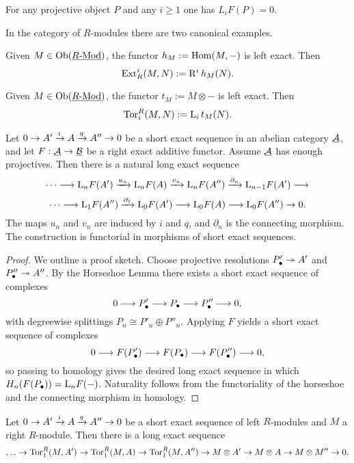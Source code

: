 \begin{remark*}
	For any projective object \( P \) and any \( i\ge 1 \) one has \( L_iF(P)=0 \).
\end{remark*}

In the category of \( R \)-modules there are two canonical examples.

\begin{examples*}
	\item Given \( M \in \operatorname{Ob}(\underline{R\text{-}\mathrm{Mod}}) \), the functor \( h_M := \operatorname{Hom}(M, -) \) is left exact. Then
		\[
			\operatorname{Ext}_R^i(M, N) := \mathrm R^i \, h_M(N).
		\]
	\item Given \( M \in \operatorname{Ob}(\underline{R\text{-}\mathrm{Mod}}) \), the functor \( t_M := M \otimes - \) is left exact. Then
		\[
			\operatorname{Tor}^R_i(M, N) := \mathrm L_i \, t_M(N).
		\]
\end{examples*}

\begin{theorem*}
	Let \( 0 \to A' \xrightarrow{i} A \xrightarrow{q} A'' \to 0 \) be a short exact sequence in an abelian category \( \underline{\mathcal A} \), and let \( F: \underline{\mathcal A} \to \underline{\mathcal B} \) be a right exact additive functor. Assume \( \underline{\mathcal A} \) has enough projectives. Then there is a natural long exact sequence
	\[
		\dotsm \longrightarrow \mathrm L_{n}F(A') \xrightarrow{u_n} \mathrm L_{n}F(A) \xrightarrow{v_n} \mathrm L_{n}F(A'') \xrightarrow{\partial_n} \mathrm L_{n-1}F(A') \longrightarrow
	\]
	\[
		\dotsm \longrightarrow \mathrm L_{1}F(A'') \xrightarrow{\partial_1} \mathrm L_{0}F(A') \longrightarrow \mathrm L_{0}F(A) \longrightarrow \mathrm L_{0}F(A'') \to 0.
	\]
	The maps \( u_n \) and \( v_n \) are induced by \( i \) and \( q \), and \( \partial_n \) is the connecting morphism. The construction is functorial in morphisms of short exact sequences.
\end{theorem*}

\begin{proof}
	We outline a proof sketch. Choose projective resolutions \( P'_\bullet \twoheadrightarrow A' \) and \( P''_\bullet \twoheadrightarrow A'' \). By the Horseshoe Lemma there exists a short exact sequence of complexes
	\[
		0 \longrightarrow P'_\bullet \longrightarrow P_\bullet \longrightarrow P''_\bullet \longrightarrow 0,
	\]
	with degreewise splittings \( P_n \cong P'_n \oplus P''_n \). Applying \( F \) yields a short exact sequence of complexes
	\[
		0 \longrightarrow F(P'_\bullet) \longrightarrow F(P_\bullet) \longrightarrow F(P''_\bullet) \longrightarrow 0,
	\]
	so passing to homology gives the desired long exact sequence in which \( H_n(F(P_\bullet)) = \mathrm L_n F(-) \). Naturality follows from the functoriality of the horseshoe and the connecting morphism in homology.
\end{proof}

\begin{example*}
	Let \( 0 \to A' \xrightarrow{i} A \xrightarrow{q} A'' \to 0 \) be a short exact sequence of left \( R \)-modules and \( M \) a right \( R \)-module. Then there is a long exact sequence
	\[
		\dotsc \to \operatorname{Tor}_1^R(M, A') \to \operatorname{Tor}_1^R(M, A) \to \operatorname{Tor}_1^R(M, A'') \to M \otimes A' \to M \otimes A \to M \otimes M'' \to 0.
	\]
\end{example*}
